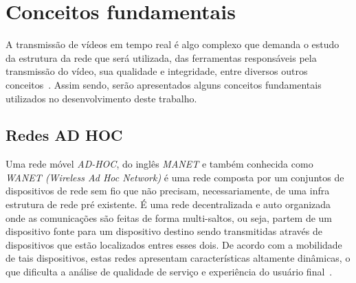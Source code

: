 \documentclass[12pt]{article}
\begin{document}
\section{Conceitos fundamentais} \label{sec:conceitos}

	A transmissão de vídeos em tempo real é algo complexo que demanda o estudo da estrutura da rede que será utilizada, das ferramentas responsáveis pela transmissão do vídeo, sua qualidade e integridade, entre diversos outros conceitos~\cite{Immich2017a}. Assim sendo, serão apresentados alguns conceitos fundamentais utilizados no desenvolvimento deste trabalho.

\subsection{Redes AD HOC}
    Uma rede móvel \textit{AD-HOC}, do inglês \textit{MANET} e também conhecida como \textit{WANET (Wireless Ad Hoc Network)} é uma rede composta por um conjuntos de dispositivos de rede sem fio que não precisam, necessariamente, de uma infra estrutura de rede pré existente. É uma rede decentralizada e auto organizada onde as comunicações são feitas de forma multi-saltos, ou seja, partem de um dispositivo fonte para um dispositivo destino sendo transmitidas através de dispositivos que estão localizados entres esses dois. De acordo com a mobilidade de tais dispositivos, estas redes apresentam características altamente dinâmicas, o que dificulta a análise de qualidade de serviço e experiência do usuário final~\cite{Immich2018}.

\end{document}
